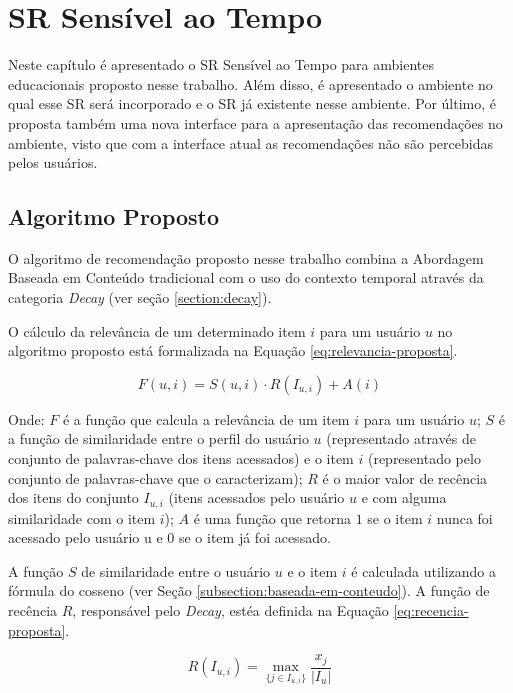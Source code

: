 \chapter{SR Sensível ao Tempo}\label{chapter:proposta}

Neste capítulo é apresentado o SR Sensível ao Tempo para ambientes educacionais proposto nesse trabalho. Além disso, é apresentado
o ambiente no qual esse SR será incorporado e o SR já existente nesse ambiente. Por último, é proposta também uma nova interface
para a apresentação das recomendações no ambiente, visto que com a interface atual as recomendações não são percebidas pelos
usuários.

\section{Algoritmo Proposto}

O algoritmo de recomendação proposto nesse trabalho combina a Abordagem Baseada em Conteúdo tradicional com o uso do
contexto temporal através da categoria \textit{Decay} (ver seção \ref{section:decay}).

O cálculo da relevância de um determinado item $i$ para um usuário $u$ no algoritmo proposto está formalizada na Equação
\ref{eq:relevancia-proposta}.

\begin{equation}
  F(u,i) = S(u,i) \cdot R(I_{u,i}) + A(i)
  \label{eq:relevancia-proposta}
\end{equation}

Onde: $F$ é a função que calcula a relevância de um item $i$ para um usuário $u$; $S$ é a função de similaridade entre
o perfil do usuário $u$ (representado através de conjunto de palavras-chave dos itens acessados) e o item $i$
(representado pelo conjunto de palavras-chave que o caracterizam); $R$ é o maior valor de recência dos itens do conjunto
$I_{u,i}$ (itens acessados pelo usuário $u$ e com alguma similaridade com o item $i$); $A$ é uma função que retorna $1$
se o item $i$ nunca foi acessado pelo usuário u e $0$ se o item já foi acessado.

A função $S$ de similaridade entre o usuário $u$ e o item $i$ é calculada utilizando a fórmula do cosseno (ver Seção
\ref{subsection:baseada-em-conteudo}). A função de recência $R$, responsável pelo \textit{Decay}, estéa definida na Equação
\ref{eq:recencia-proposta}.

\begin{equation}
  R(I_{u,i}) = \max_{\{j \in I_{u,i}\}}{\frac{x_j}{\left| I_u \right|}}
  \label{eq:recencia-proposta}
\end{equation}

